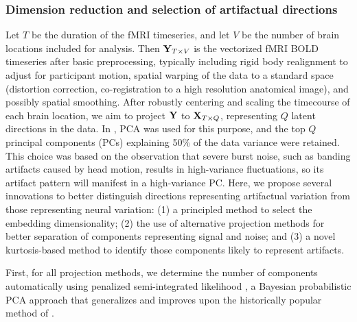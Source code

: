 \documentclass{article}
\begin{document}
\subsubsection{Dimension reduction and selection of artifactual directions}

Let $T$ be the duration of the fMRI timeseries, and let $V$ be the number of brain locations included for analysis.  Then $\mathbf Y_{T\times V}$ is the vectorized fMRI BOLD timeseries after basic preprocessing, typically including rigid body realignment to adjust for participant motion, spatial warping of the data to a standard space (distortion correction, co-registration to a high resolution anatomical image), and possibly spatial smoothing.  After robustly centering and scaling the timecourse of each brain location, we aim to project $\mathbf Y$ to $\mathbf X_{T\times Q}$, representing $Q$ latent directions in the data.  In \cite{mejiaPCALeverageOutlier2017}, PCA was used for this purpose, and the top $Q$ principal components (PCs) explaining 50\% of the data variance were retained. This choice was based on the observation that severe burst noise, such as banding artifacts caused by head motion, results in high-variance fluctuations, so its artifact pattern will manifest in a high-variance PC. Here, we propose several innovations to better distinguish directions representing artifactual variation from those representing neural variation: (1) a principled method to select the embedding dimensionality; (2) the use of alternative projection methods for better separation of components representing signal and noise; and (3) a novel kurtosis-based method to identify those components likely to represent artifacts.

First, for all projection methods, we determine the number of components automatically using penalized semi-integrated likelihood \citep[PESEL,][]{sobczykBayesianDimensionalityReduction2017}, a Bayesian probabilistic PCA approach that generalizes and improves upon the historically popular method of \cite{minkaAutomaticChoiceDimensionality2000}.  
\end{document}
